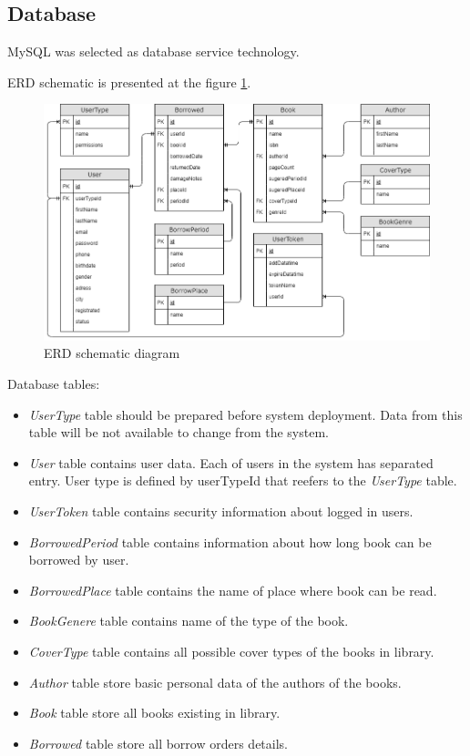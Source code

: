 \subsection{Database}
MySQL was selected as database service technology.

ERD schematic is presented at the figure \ref{fig:database_erd_schematic}.
\begin{figure}[h]
    \centering
    \includegraphics[width=\textwidth]{Include/Resources/Database/Project/databse_ERD_diagram.png}
    \caption{ERD schematic diagram}
    \label{fig:database_erd_schematic}
\end{figure}

Database tables:
\begin{itemize}
    \item \textit{UserType} table should be prepared before system deployment. Data from this table will be not available to change from the system.
    
    \item \textit{User} table contains user data. Each of users in the system has separated entry. User type  is defined by userTypeId that reefers to the \textit{UserType} table.
    
    \item \textit{UserToken} table contains security information about logged in users.
    
    \item \textit{BorrowedPeriod} table contains information about how long book can be borrowed by user.
    
    \item \textit{BorrowedPlace} table contains the name of place where book can be read.
    
    \item \textit{BookGenere} table contains name of the type of the book.
    
    \item \textit{CoverType} table contains all possible cover types of the books in library.
    
    \item \textit{Author} table store basic personal data of the authors of the books.
    
    \item \textit{Book} table store all books existing in library.
    
    \item \textit{Borrowed} table store all borrow orders details.
\end{itemize}
